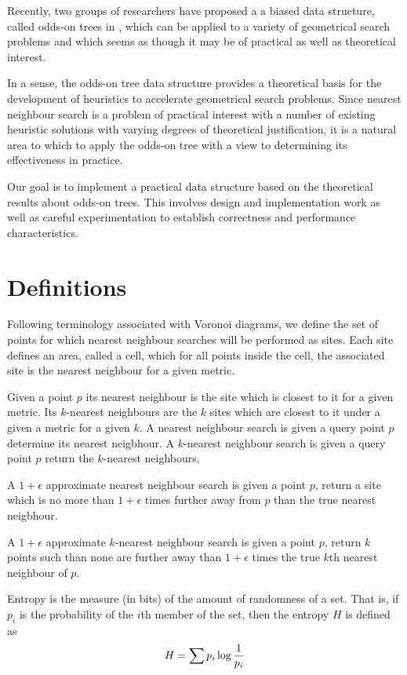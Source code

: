 \documentclass[mcs]{scsthesis}
\begin{document}
Recently, two groups of researchers \cite{oddson,chan} have proposed a
a biased data structure, called odds-on trees in \cite{oddson},  which can be
applied to a variety of geometrical search problems and which seems as though it
may be of practical as well as theoretical interest.

In a sense, the odds-on tree data structure provides a theoretical basis for
the development of heuristics to accelerate geometrical search problems. Since
nearest neighbour search is a problem of practical interest with a number of
existing heuristic solutions with varying degrees of theoretical justification,
it is a natural area to which to apply the odds-on tree with a view to
determining its effectiveness in practice.

Our goal is to implement a practical data structure based on the theoretical
results about odds-on trees.  This involves design and implementation work as
well as careful experimentation to establish correctness and performance
characteristics.

\section{Definitions}

Following terminology associated with Voronoi diagrams, we define the set of
points for which nearest neighbour searches will be performed as sites. Each
site defines an area, called a cell, which for all points inside the cell, the
associated site is the nearest neighbour for a given metric.

Given a point \(p\) its nearest neighbour is the site which is closest to it
for a given metric. Its $k$-nearest neighbours are the $k$ sites which are
closest to it under a given a metric for a given $k$.  A nearest neighbour
search is given a query point \(p\) determine its nearest neigbhour.
A \(k\)-nearest neighbour search is given a query point \(p\) return the
$k$-nearest neighbours.

A \(1 + \epsilon\) approximate nearest neighbour search is given a point \(p\),
return a site which is no more than \(1 + \epsilon\) times further away from $p$
than the true nearest neigbhour.

A \(1 + \epsilon\) approximate \(k\)-nearest neighbour search is given a point
\(p\), return \(k\) points such than none are further away than \(1 + \epsilon\)
times the true \(k\)th nearest neighbour of $p$.

Entropy is the measure (in bits) of the amount of randomness of a set.  That is,
if \(p_i\) is the probability of the $i$th member of the set, then the entropy
\(H\) is defined as
$$
H = \sum{ p_i \log{1 \over p_i}}
$$
\end{document}
